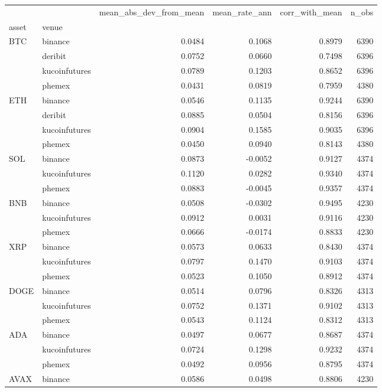\begin{tabular}{llrrrr}
\toprule
 &  & mean_abs_dev_from_mean & mean_rate_ann & corr_with_mean & n_obs \\
asset & venue &  &  &  &  \\
\midrule
\multirow[t]{4}{*}{BTC} & binance & 0.0484 & 0.1068 & 0.8979 & 6390 \\
 & deribit & 0.0752 & 0.0660 & 0.7498 & 6396 \\
 & kucoinfutures & 0.0789 & 0.1203 & 0.8652 & 6396 \\
 & phemex & 0.0431 & 0.0819 & 0.7959 & 4380 \\
\cline{1-6}
\multirow[t]{4}{*}{ETH} & binance & 0.0546 & 0.1135 & 0.9244 & 6390 \\
 & deribit & 0.0885 & 0.0504 & 0.8156 & 6396 \\
 & kucoinfutures & 0.0904 & 0.1585 & 0.9035 & 6396 \\
 & phemex & 0.0450 & 0.0940 & 0.8143 & 4380 \\
\cline{1-6}
\multirow[t]{3}{*}{SOL} & binance & 0.0873 & -0.0052 & 0.9127 & 4374 \\
 & kucoinfutures & 0.1120 & 0.0282 & 0.9340 & 4374 \\
 & phemex & 0.0883 & -0.0045 & 0.9357 & 4374 \\
\cline{1-6}
\multirow[t]{3}{*}{BNB} & binance & 0.0508 & -0.0302 & 0.9495 & 4230 \\
 & kucoinfutures & 0.0912 & 0.0031 & 0.9116 & 4230 \\
 & phemex & 0.0666 & -0.0174 & 0.8833 & 4230 \\
\cline{1-6}
\multirow[t]{3}{*}{XRP} & binance & 0.0573 & 0.0633 & 0.8430 & 4374 \\
 & kucoinfutures & 0.0797 & 0.1470 & 0.9103 & 4374 \\
 & phemex & 0.0523 & 0.1050 & 0.8912 & 4374 \\
\cline{1-6}
\multirow[t]{3}{*}{DOGE} & binance & 0.0514 & 0.0796 & 0.8326 & 4313 \\
 & kucoinfutures & 0.0752 & 0.1371 & 0.9102 & 4313 \\
 & phemex & 0.0543 & 0.1124 & 0.8312 & 4313 \\
\cline{1-6}
\multirow[t]{3}{*}{ADA} & binance & 0.0497 & 0.0677 & 0.8687 & 4374 \\
 & kucoinfutures & 0.0724 & 0.1298 & 0.9232 & 4374 \\
 & phemex & 0.0492 & 0.0956 & 0.8795 & 4374 \\
\cline{1-6}
\multirow[t]{3}{*}{AVAX} & binance & 0.0586 & 0.0498 & 0.8806 & 4230 \\

\end{tabular}
